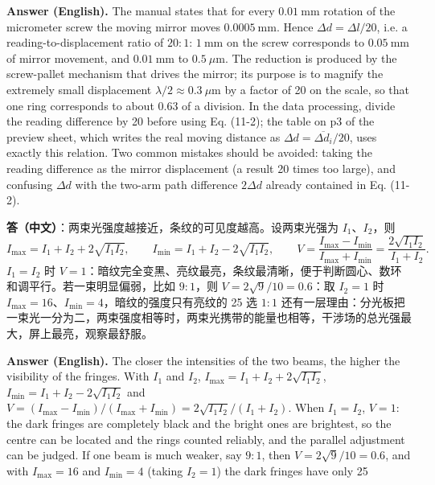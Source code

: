 \documentclass[11pt]{ctexart}
\newcommand{\Dl}{d}
\newcommand{\qaneed}[1]{\needspace{#1\textheight}}
\begin{document}
\textbf{Answer (English).} The manual states that for every $0.01\ \mathrm{mm}$ rotation of the micrometer screw the moving mirror moves $0.0005\ \mathrm{mm}$. Hence $\Delta\Dl=\Delta l/20$, i.e. a reading-to-displacement ratio of $20:1$: $1\ \mathrm{mm}$ on the screw corresponds to $0.05\ \mathrm{mm}$ of mirror movement, and $0.01\ \mathrm{mm}$ to $0.5\ \mu\mathrm{m}$. The reduction is produced by the screw-pallet mechanism that drives the mirror; its purpose is to magnify the extremely small displacement $\lambda/2\approx0.3\ \mu\mathrm{m}$ by a factor of 20 on the scale, so that one ring corresponds to about $0.63$ of a division. In the data processing, divide the reading difference by 20 before using Eq. (11-2); the table on p3 of the preview sheet, which writes the real moving distance as $\Delta\Dl=\overline{\Delta\Dl_i}/20$, uses exactly this relation. Two common mistakes should be avoided: taking the reading difference as the mirror displacement (a result 20 times too large), and confusing $\Delta\Dl$ with the two-arm path difference $2\Delta\Dl$ already contained in Eq. (11-2).

\qaneed{0.58}


\textbf{答（中文）}：两束光强度越接近，条纹的可见度越高。设两束光强为 $I_1$、$I_2$，则
\[
  I_{\max}=I_1+I_2+2\sqrt{I_1I_2},\qquad
  I_{\min}=I_1+I_2-2\sqrt{I_1I_2},\qquad
  V=\frac{I_{\max}-I_{\min}}{I_{\max}+I_{\min}}=\frac{2\sqrt{I_1I_2}}{I_1+I_2}.
\]
$I_1=I_2$ 时 $V=1$：暗纹完全变黑、亮纹最亮，条纹最清晰，便于判断圆心、数环和调平行。若一束明显偏弱，比如 $9:1$，则 $V=2\sqrt{9}/10=0.6$：取 $I_2=1$ 时 $I_{\max}=16$、$I_{\min}=4$，暗纹的强度只有亮纹的 25%
选 $1:1$ 还有一层理由：分光板把一束光一分为二，两束强度相等时，两束光携带的能量也相等，干涉场的总光强最大，屏上最亮，观察最舒服。

\textbf{Answer (English).} The closer the intensities of the two beams, the higher the visibility of the fringes. With $I_1$ and $I_2$,
$I_{\max}=I_1+I_2+2\sqrt{I_1I_2}$, $I_{\min}=I_1+I_2-2\sqrt{I_1I_2}$ and
$V=(I_{\max}-I_{\min})/(I_{\max}+I_{\min})=2\sqrt{I_1I_2}/(I_1+I_2)$.
When $I_1=I_2$, $V=1$: the dark fringes are completely black and the bright ones are brightest, so the centre can be located and the rings counted reliably, and the parallel adjustment can be judged. If one beam is much weaker, say $9:1$, then $V=2\sqrt{9}/10=0.6$, and with $I_{\max}=16$ and $I_{\min}=4$ (taking $I_2=1$) the dark fringes have only 25%
\end{document}
